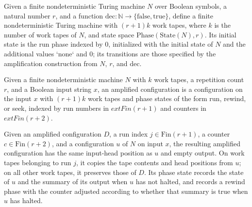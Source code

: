 \begin{definition}
\label{Randomized.Amplify.amp}
\leanok
{}
Given a finite nondeterministic Turing machine $N$ over Boolean symbols, a natural
number $r$, and a function $\mathrm{dec} : \mathbb{N} \to
\{\mathrm{false},\mathrm{true}\}$, define a finite nondeterministic Turing machine with
$(r+1)k$ work tapes, where $k$ is the number of work tapes of $N$, and state space
$\mathrm{Phase}(\mathrm{State}(N),r)$. Its initial state is the run phase indexed by
$0$, initialized with the initial state of $N$ and the additional values `none` and $0$;
its transitions are those specified by the amplification construction from $N$, $r$, and
$\mathrm{dec}$.
\end{definition}

\begin{definition}
\label{Randomized.Amplify.ACfg}
\leanok
{}
Given a finite nondeterministic machine $N$ with $k$ work tapes, a repetition count $r$,
and a Boolean input string $x$, an amplified configuration is a configuration on the
input $x$ with $(r+1)k$ work tapes and phase states of the form run, rewind, or seek,
indexed by run numbers in $	ext{Fin}(r+1)$ and counters in $	ext{Fin}(r+2)$.
\end{definition}

\begin{definition}
\label{Randomized.Amplify.emb}
\leanok
{}
Given an amplified configuration $D$, a run index $j\in\text{Fin}(r+1)$, a counter
$c\in\text{Fin}(r+2)$, and a configuration $u$ of $N$ on input $x$, the resulting
amplified configuration has the same input-head position as $u$ and empty output. On
work tapes belonging to run $j$, it copies the tape contents and head positions from
$u$; on all other work tapes, it preserves those of $D$. Its phase state records the
state of $u$ and the summary of its output when $u$ has not halted, and records a rewind
phase with the counter adjusted according to whether that summary is true when $u$ has
halted.
\end{definition}

